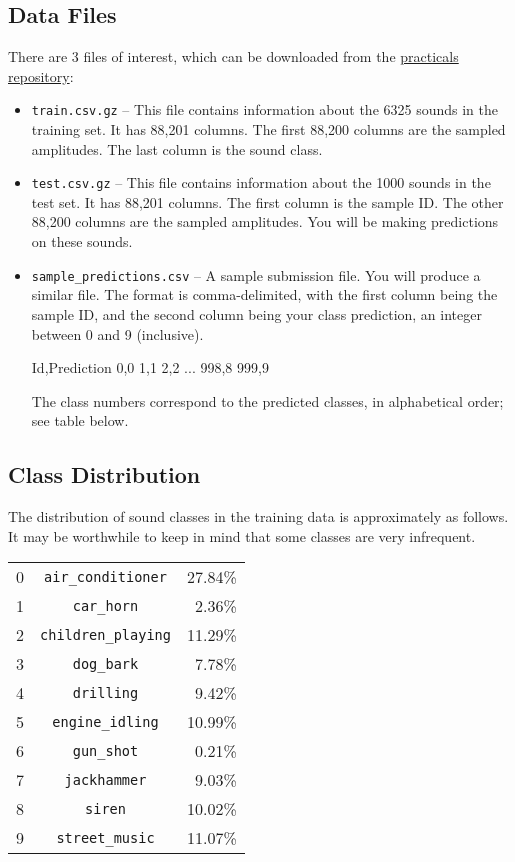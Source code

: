 \documentclass[12pt]{article}
\begin{document}
\subsection*{Data Files}
There are 3 files of interest, which can be downloaded from the \href{https://github.com/harvard-ml-courses/cs181-s18-practicals}{practicals repository}:
\begin{itemize}
\item \verb|train.csv.gz| -- This file contains information about the 6325 sounds in the training set. It has 88,201 columns. The first 88,200 columns are the sampled amplitudes. The last column is the sound class.

\item \verb|test.csv.gz| -- This file contains information about the 1000 sounds in the test set. It has 88,201 columns. The first column is the sample ID. The other 88,200 columns are the sampled amplitudes. You will be making predictions on these sounds.

\item \verb|sample_predictions.csv| -- A sample submission file.  
      You will produce a similar file.  
      The format is comma-delimited, with the first column being the sample ID, 
      and the second column being your class prediction, an integer between 0 and 9 
      (inclusive).
\begin{csv}
Id,Prediction
0,0
1,1
2,2
...
998,8
999,9
\end{csv}
The class numbers correspond to the predicted classes, in alphabetical order; see table below.

\end{itemize}

\subsection*{Class Distribution}
The distribution of sound classes in the training data is approximately as follows. It may be worthwhile to keep in mind that some classes are very infrequent.
\begin{center}
\begin{tabular}{r c r}
    0 &\verb|air_conditioner| & 27.84\% \\
    1 &\verb|car_horn| & 2.36\% \\
    2 &\verb|children_playing| & 11.29\%\\
    3 &\verb|dog_bark| & 7.78\%\\
    4 &\verb|drilling| & 9.42\%\\
    5 &\verb|engine_idling| & 10.99\%    \\
    6 &\verb|gun_shot| & 0.21\%\\
    7 &\verb|jackhammer| & 9.03\%\\
    8 &\verb|siren| & 10.02\%\\
    9 &\verb|street_music| & 11.07\%
\end{tabular}
\end{center}
\end{document}
